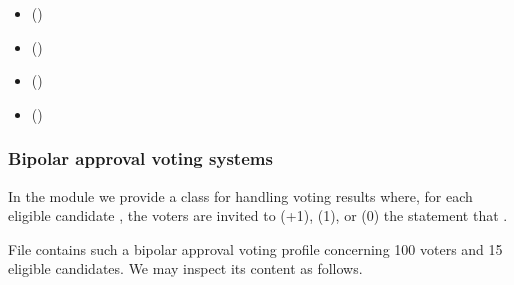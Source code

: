 \documentclass[a4paper,12pt,english]{sphinxhowto}
\begin{document}
\begin{sphinxcontents}
\begin{itemize}
\item {} 
\sphinxAtStartPar
{}\label{\detokenize{pearls:id161}}{\hyperref[\detokenize{pearls:bipolar-approval-voting-systems}]{}} ()

\item {} 
\sphinxAtStartPar
{}\label{\detokenize{pearls:id162}}{\hyperref[\detokenize{pearls:pairwise-comparison-of-bipolar-approval-votes}]{}} ()

\item {} 
\sphinxAtStartPar
{}\label{\detokenize{pearls:id163}}{\hyperref[\detokenize{pearls:three-valued-evaluative-voting-system}]{}} ()

\item {} 
\sphinxAtStartPar
{}\label{\detokenize{pearls:id164}}{\hyperref[\detokenize{pearls:favouring-multipartisan-candidates}]{}} ()

\end{itemize}
\end{sphinxcontents}


\subsubsection{Bipolar approval voting systems}
\label{\detokenize{pearls:bipolar-approval-voting-systems}}
\sphinxAtStartPar
In the  module we provide a  class for handling voting results where, for each eligible candidate , the voters are invited  to  (+1),  (\sphinxhyphen{}1), or  (0) the statement that .

\sphinxAtStartPar
File  contains such a bipolar approval voting profile concerning 100 voters and 15 eligible candidates. We may inspect its content as follows.
\end{document}
